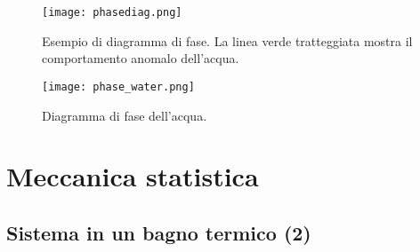 \documentclass[a4paper]{report}
\begin{document}
\begin{figure}[h]
    \centering
    \texttt{[image: phasediag.png]}
    \caption{Esempio di diagramma di fase. La linea verde tratteggiata mostra il comportamento anomalo dell'acqua.}
    \label{phasediag}
\end{figure}
\begin{figure}[h]
    \centering
    \texttt{[image: phase\_water.png]}
    \caption{Diagramma di fase dell'acqua.}
    \label{phase_water}
\end{figure}

\chapter{Meccanica statistica}

\section{Sistema in un bagno termico (2)}
\end{document}
